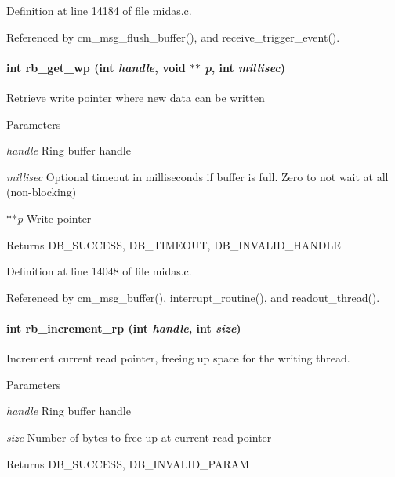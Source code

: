 Definition at line 14184 of file midas.c.

Referenced by cm\_\-msg\_\-flush\_\-buffer(), and receive\_\-trigger\_\-event().
\paragraph[{rb\_\-get\_\-wp}]{\setlength{\rightskip}{0pt plus 5cm}int rb\_\-get\_\-wp (int {\em handle}, \/  void $\ast$$\ast$ {\em p}, \/  int {\em millisec})}\hfill\label{group__rbfunctionc_ga26333526532b367bfacce172d6adcfa6}
Retrieve write pointer where new data can be written 
\begin{DoxyParams}{Parameters}
\item[{\em handle}]Ring buffer handle \item[{\em millisec}]Optional timeout in milliseconds if buffer is full. Zero to not wait at all (non-\/blocking) \item[{\em $\ast$$\ast$p}]Write pointer \end{DoxyParams}
\begin{DoxyReturn}{Returns}
DB\_\-SUCCESS, DB\_\-TIMEOUT, DB\_\-INVALID\_\-HANDLE 
\end{DoxyReturn}


Definition at line 14048 of file midas.c.

Referenced by cm\_\-msg\_\-buffer(), interrupt\_\-routine(), and readout\_\-thread().
\paragraph[{rb\_\-increment\_\-rp}]{\setlength{\rightskip}{0pt plus 5cm}int rb\_\-increment\_\-rp (int {\em handle}, \/  int {\em size})}\hfill\label{group__rbfunctionc_ga4d2d9f33813530718f4b1f3d423a3b7b}
Increment current read pointer, freeing up space for the writing thread.


\begin{DoxyParams}{Parameters}
\item[{\em handle}]Ring buffer handle \item[{\em size}]Number of bytes to free up at current read pointer \end{DoxyParams}
\begin{DoxyReturn}{Returns}
DB\_\-SUCCESS, DB\_\-INVALID\_\-PARAM 
\end{DoxyReturn}



